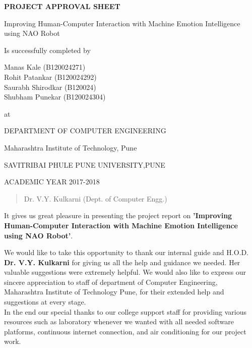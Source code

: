 \documentclass[oneside,a4paper,12pt]{report}
\begin{document}
\begin{center}
\textbf{PROJECT APPROVAL SHEET}
\end{center}
\begin{center}
Improving Human-Computer Interaction with Machine Emotion Intelligence using NAO Robot
\end{center}
\begin{center}
Is successfully completed by 
\end{center}
\begin{center}
Manas Kale         (B120024271) \\
Rohit Patankar     (B120024292)  \\
Saurabh Shirodkar  (B120024)  \\
Shubham Punekar    (B120024304) \\
\end{center}
\begin{center}
 at
 \end{center} 
 \begin{center}
 DEPARTMENT OF COMPUTER ENGINEERING
 \end{center}
 \begin{center}
 Maharashtra Institute of Technology, Pune
 \end{center}
 \begin{center}
 SAVITRIBAI PHULE PUNE UNIVERSITY,PUNE
 \end{center}
 
 \begin{center}
 ACADEMIC YEAR 2017-2018
 \end{center}
 \noindent
 \vspace{0,3 in}
 \begin{quote}
Dr. V.Y. Kulkarni (Dept. of Computer Engg.)
\end{quote}
\newpage

{   \setlength{\parindent}{11mm} }
\begin{center}
	It gives us great pleasure in presenting the project report 
		on 
		{\bfseries \fontsize{12}{12} \selectfont 'Improving Human-Computer Interaction with Machine Emotion Intelligence using NAO Robot'}.
	\vspace*{1.5\baselineskip}
	
	We would like to take this opportunity to thank our internal guide and H.O.D.
		\textbf{Dr. V.Y. Kulkarni} for giving us all the help and guidance we needed. Her valuable suggestions were extremely helpful. We would also like to express our sincere appreciation to staff of department of Computer Engineering, Maharashtra Institute of Technology Pune, for their extended help and suggestions at every stage.\\
	In the end our special thanks to our college support staff for providing various resources such as  laboratory whenever we wanted with all needed software platforms, continuous internet connection, and air conditioning for our project work.
	\vspace*{1.5\baselineskip}
\end{center}
\end{document}
